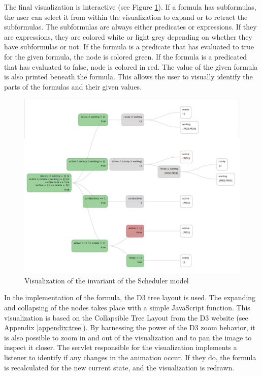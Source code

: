 The final visualization is interactive (see Figure \ref{predicate}). If a formula has subformulas, the user can select it from within the visualization to expand or to retract the subformulas. The subformulas are always either predicates or expressions. If they are expressions, they are colored white or light grey depending on whether they have subformulas or not. If the formula is a predicate that has evaluated to true for the given formula, the node is colored green. If the formula is a predicated that has evaluated to false, node is colored in red. The value of the given formula is also printed beneath the formula. This allows the user to visually identify the parts of the formulas and their given values. 

\begin{center}
\begin{figure}[h!]
\centering
\includegraphics[width=14cm]{bilder/invariant.png}
\caption{Visualization of the invariant of the Scheduler model}
\label{predicate}
\end{figure}
\end{center}

In the implementation of the formula, the D3 tree layout is used. The expanding and collapsing of the nodes takes place with a simple JavaScript function. This visualization is based on the Collapsible Tree Layout from the D3 website (see Appendix \ref{appendix:tree}). By harnessing the power of the D3 zoom behavior, it is also possible to zoom in and out of the visualization and to pan the image to inspect it closer. The servlet responsible for the visualization implements a listener to identify if any changes in the animation occur. If they do, the formula is recalculated for the new current state, and the visualization is redrawn.

